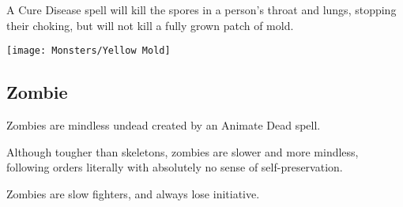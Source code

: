 \begin{multicols*}{2}
A Cure Disease spell will kill the spores in a person’s throat and lungs, stopping their choking, but will not kill a fully grown patch of mold.

\texttt{[image: Monsters/Yellow Mold]}

\subsection{Zombie}

Zombies are mindless undead created by an Animate Dead spell.

Although tougher than skeletons, zombies are slower and more mindless, following orders literally with absolutely no sense of self-preservation.

Zombies are slow fighters, and always lose initiative.

\end{multicols*}

